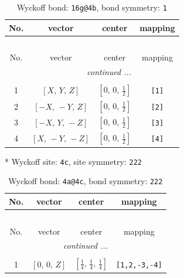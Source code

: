 \documentclass[fleqn,8pt]{jsarticle}
\begin{document}
\begin{longtable}{cccc}
\caption{Wyckoff bond: {\tt 16g@4b}, bond symmetry: {\tt 1}}
 \\
 \hline \hline
No. & vector & center & mapping \\ \hline \endfirsthead

\multicolumn{3}{l}{\tablename\ \thetable{}} \\
 \hline \hline
No. & vector & center & mapping \\ \hline \endhead

 \hline \hline
\multicolumn{3}{r}{\footnotesize\it continued ...} \\ \endfoot

 \hline \hline
\multicolumn{3}{r}{} \\ \endlastfoot

1 & $\left[ X,\, Y,\, Z \right]$ & $\left[ 0,\, 0,\, \frac{1}{2} \right]$ & {\tt [1]} \\ \hline
2 & $\left[ - X,\, - Y,\, Z \right]$ & $\left[ 0,\, 0,\, \frac{1}{2} \right]$ & {\tt [2]} \\ \hline
3 & $\left[ - X,\, Y,\, - Z \right]$ & $\left[ 0,\, 0,\, \frac{1}{2} \right]$ & {\tt [3]} \\ \hline
4 & $\left[ X,\, - Y,\, - Z \right]$ & $\left[ 0,\, 0,\, \frac{1}{2} \right]$ & {\tt [4]} \\
\end{longtable}
* Wyckoff site: {\tt 4c}, site symmetry: {\tt 222}
\renewcommand{\arraystretch}{1.2}
\begin{longtable}{cccc}
\caption{Wyckoff bond: {\tt 4a@4c}, bond symmetry: {\tt 222}}
 \\
 \hline \hline
No. & vector & center & mapping \\ \hline \endfirsthead

\multicolumn{3}{l}{\tablename\ \thetable{}} \\
 \hline \hline
No. & vector & center & mapping \\ \hline \endhead

 \hline \hline
\multicolumn{3}{r}{\footnotesize\it continued ...} \\ \endfoot

 \hline \hline
\multicolumn{3}{r}{} \\ \endlastfoot

1 & $\left[ 0,\, 0,\, Z \right]$ & $\left[ \frac{1}{4},\, \frac{1}{4},\, \frac{1}{4} \right]$ & {\tt [1,2,-3,-4]} \\
\end{longtable}
\renewcommand{\arraystretch}{1.2}
\end{document}
